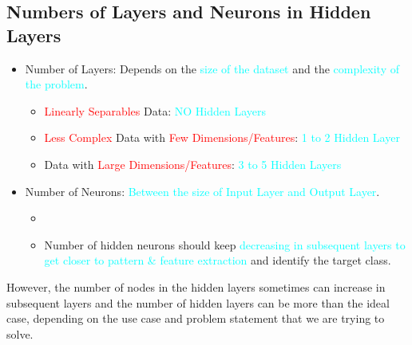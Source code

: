 \documentclass{book}
\begin{document}
\subsection{Numbers of Layers and Neurons in Hidden Layers}
\begin{itemize}
    \item Number of Layers: Depends on the \textcolor{cyan}{size of the dataset} and the \textcolor{cyan}{complexity of the problem}.
    \begin{itemize}
        \item \textcolor{red}{Linearly Separables} Data: \textcolor{cyan}{NO Hidden Layers}
        \item \textcolor{red}{Less Complex} Data with \textcolor{red}{Few Dimensions/Features}: \textcolor{cyan}{1 to 2 Hidden Layer}
        \item Data with \textcolor{red}{Large Dimensions/Features}: \textcolor{cyan}{3 to 5 Hidden Layers}
    \end{itemize}
    \item Number of Neurons: \textcolor{cyan}{Between the size of Input Layer and Output Layer}.
    \begin{itemize}
        \item {}
        \item Number of hidden neurons should keep \textcolor{cyan}{decreasing in subsequent layers to get closer to pattern \& feature extraction} and identify the target class.
    \end{itemize}
\end{itemize}
However, the number of nodes in the hidden layers sometimes can increase in subsequent layers and the number of hidden layers can be more than the ideal case, depending on the use case and problem statement that we are trying to solve.
\newpage
\end{document}
